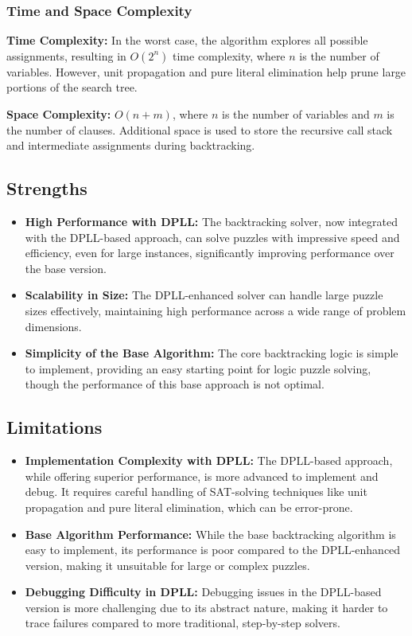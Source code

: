 \subsubsection{Time and Space Complexity}
\textbf{Time Complexity:} In the worst case, the algorithm explores all possible assignments, resulting in \(O(2^n)\) time complexity, where \(n\) is the number of variables. However, unit propagation and pure literal elimination help prune large portions of the search tree.

\textbf{Space Complexity:} \(O(n+m)\), where \(n\) is the number of variables and \(m\) is the number of clauses. Additional space is used to store the recursive call stack and intermediate assignments during backtracking.

\subsection*{Strengths}
\begin{itemize}
    \item \textbf{High Performance with DPLL:} The backtracking solver, now integrated with the DPLL-based approach, can solve puzzles with impressive speed and efficiency, even for large instances, significantly improving performance over the base version.
    \item \textbf{Scalability in Size:} The DPLL-enhanced solver can handle large puzzle sizes effectively, maintaining high performance across a wide range of problem dimensions.
    \item \textbf{Simplicity of the Base Algorithm:} The core backtracking logic is simple to implement, providing an easy starting point for logic puzzle solving, though the performance of this base approach is not optimal.
\end{itemize}

\subsection*{Limitations}
\begin{itemize}
    \item \textbf{Implementation Complexity with DPLL:} The DPLL-based approach, while offering superior performance, is more advanced to implement and debug. It requires careful handling of SAT-solving techniques like unit propagation and pure literal elimination, which can be error-prone.
    \item \textbf{Base Algorithm Performance:} While the base backtracking algorithm is easy to implement, its performance is poor compared to the DPLL-enhanced version, making it unsuitable for large or complex puzzles.
    \item \textbf{Debugging Difficulty in DPLL:} Debugging issues in the DPLL-based version is more challenging due to its abstract nature, making it harder to trace failures compared to more traditional, step-by-step solvers.
\end{itemize}


